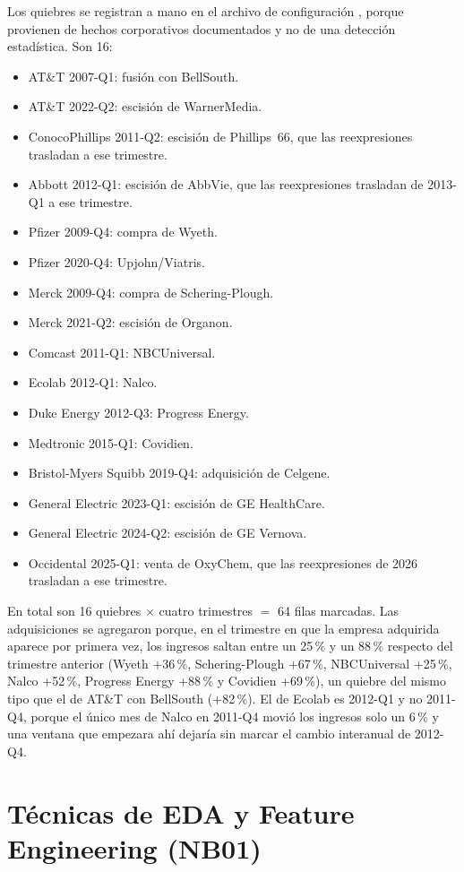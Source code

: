 \documentclass[12pt,letterpaper,oneside]{report}
\renewcommand{\_}{\UnderscoreOriginal\allowbreak}
\begin{document}
Los quiebres se registran a mano en el archivo de configuración , porque provienen de hechos corporativos documentados y no de una detección estadística. Son 16:
\begin{itemize}
  \item AT\&T 2007-Q1: fusión con BellSouth.
  \item AT\&T 2022-Q2: escisión de WarnerMedia.
  \item ConocoPhillips 2011-Q2: escisión de Phillips~66, que las reexpresiones trasladan a ese trimestre.
  \item Abbott 2012-Q1: escisión de AbbVie, que las reexpresiones trasladan de 2013-Q1 a ese trimestre.
  \item Pfizer 2009-Q4: compra de Wyeth.
  \item Pfizer 2020-Q4: Upjohn/Viatris.
  \item Merck 2009-Q4: compra de Schering-Plough.
  \item Merck 2021-Q2: escisión de Organon.
  \item Comcast 2011-Q1: NBCUniversal.
  \item Ecolab 2012-Q1: Nalco.
  \item Duke Energy 2012-Q3: Progress Energy.
  \item Medtronic 2015-Q1: Covidien.
  \item Bristol-Myers Squibb 2019-Q4: adquisición de Celgene.
  \item General Electric 2023-Q1: escisión de GE HealthCare.
  \item General Electric 2024-Q2: escisión de GE Vernova.
  \item Occidental 2025-Q1: venta de OxyChem, que las reexpresiones de 2026 trasladan a ese trimestre.
\end{itemize}
En total son 16 quiebres $\times$ cuatro trimestres $=$ 64 filas marcadas. Las adquisiciones se agregaron porque, en el trimestre en que la empresa adquirida aparece por primera vez, los ingresos saltan entre un 25\,\% y un 88\,\% respecto del trimestre anterior (Wyeth +36\,\%, Schering-Plough +67\,\%, NBCUniversal +25\,\%, Nalco +52\,\%, Progress Energy +88\,\% y Covidien +69\,\%), un quiebre del mismo tipo que el de AT\&T con BellSouth (+82\,\%). El de Ecolab es 2012-Q1 y no 2011-Q4, porque el único mes de Nalco en 2011-Q4 movió los ingresos solo un 6\,\% y una ventana que empezara ahí dejaría sin marcar el cambio interanual de 2012-Q4.

\section{Técnicas de EDA y Feature Engineering (NB01)}
\label{sec:tecnicas}
\end{document}
